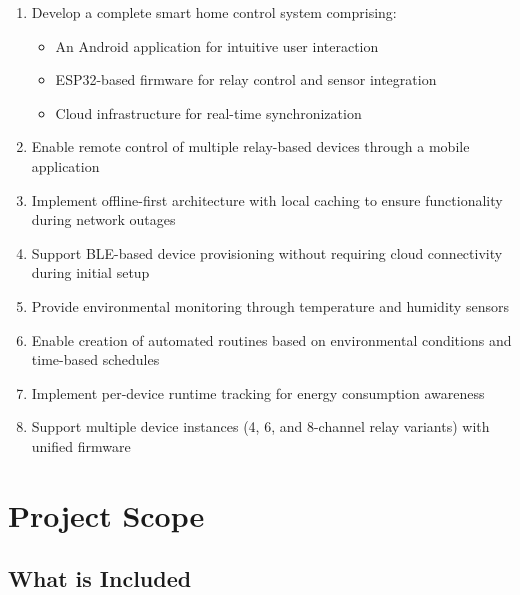 \begin{enumerate}
    \item Develop a complete smart home control system comprising:
    \begin{itemize}
        \item An Android application for intuitive user interaction
        \item ESP32-based firmware for relay control and sensor integration
        \item Cloud infrastructure for real-time synchronization
    \end{itemize}
    
    \item Enable remote control of multiple relay-based devices through a mobile application
    
    \item Implement offline-first architecture with local caching to ensure functionality during network outages
    
    \item Support BLE-based device provisioning without requiring cloud connectivity during initial setup
    
    \item Provide environmental monitoring through temperature and humidity sensors
    
    \item Enable creation of automated routines based on environmental conditions and time-based schedules
    
    \item Implement per-device runtime tracking for energy consumption awareness
    
    \item Support multiple device instances (4, 6, and 8-channel relay variants) with unified firmware
\end{enumerate}

\section{Project Scope}

\subsection{What is Included}

